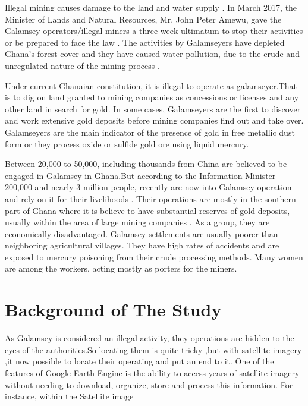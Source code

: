 Illegal mining causes damage to the land and water supply \parencite{Ansah2017} . In March 2017, the Minister of Lands and Natural Resources, Mr. John Peter Amewu, gave the Galamsey operators/illegal miners a three-week ultimatum to stop their activities or be prepared to face the law \parencite{Allotey2017} . The activities by Galamseyers have depleted Ghana's forest cover and they have caused water pollution, due to the crude and unregulated nature of the mining process \parencite{Gyekye}.

Under current Ghanaian constitution, it is illegal to operate as galamseyer.That is to dig on land granted to mining companies as concessions or licenses and any other land in search for gold. In some cases, Galamseyers are the first to discover and work extensive gold deposits before mining companies find out and take over. Galamseyers are the main indicator of the presence of gold in free metallic dust form or they process oxide or sulfide gold ore using liquid mercury.

Between 20,000 to 50,000, including thousands from China are believed to be engaged in Galamsey in Ghana.But according to the Information Minister 200,000 and nearly 3 million people, recently are now into Galamsey operation and rely on it for their livelihoods \parencite{goldgu2017}. Their operations are mostly in the southern part of Ghana where it is believe to have substantial reserves of gold deposits, usually within the area of large mining companies \parencite{Barenblitt2021} . As a group, they are economically disadvantaged. Galamsey settlements are usually poorer than neighboring agricultural villages. They have high rates of accidents and are exposed to mercury poisoning from their crude processing methods. Many women are among the workers, acting mostly as porters for the miners.

\section{Background of The Study}

As Galamsey is considered an illegal activity, they operations are hidden to the eyes of the authorities.So locating them is quite tricky ,but with satellite imagery ,it now possible to locate their operating and put an end to it. One of the features of Google Earth Engine is the ability to access years of satellite imagery without needing to download, organize, store and process this information. For instance, within the Satellite image

